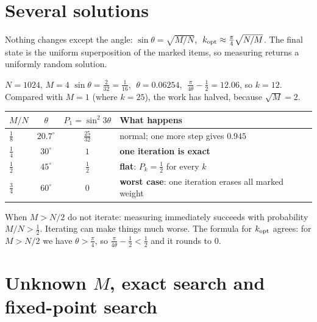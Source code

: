 \documentclass[11pt,a4paper,openany]{book}
\newcounter{wex}[section]
\newcommand{\kopt}{k_{\rm opt}}
\begin{document}
\section{Several solutions}
Nothing changes except the angle: $\sin\theta = \sqrt{M/N}$, $\;\kopt \approx \frac\pi4\sqrt{N/M}$. The final state is the uniform superposition of the marked items, so measuring returns a uniformly random solution.
\begin{wexample}{$N = 1024$, $M = 4$}
$\sin\theta = \frac{2}{32} = \frac{1}{16}$, $\;\theta = 0.06254$, $\;\frac{\pi}{4\theta} - \frac12 = 12.06$, so $k = 12$. Compared with $M = 1$ (where $k = 25$), the work has halved, because $\sqrt M = 2$.
\end{wexample}
\begin{center}
\renewcommand{\arraystretch}{1.2}
\begin{tabular}{@{}lccl@{}}
\toprule
$M/N$ & $\theta$ & $P_1 = \sin^2 3\theta$ & What happens\\ \midrule
$\frac18$ & $20.7^\circ$ & $\frac{25}{32}$ & normal; one more step gives $0.945$\\
$\frac14$ & $30^\circ$ & $1$ & \textbf{one iteration is exact}\\
$\frac12$ & $45^\circ$ & $\frac12$ & \textbf{flat}: $P_k = \frac12$ for every $k$\\
$\frac34$ & $60^\circ$ & $0$ & \textbf{worst case}: one iteration erases all marked weight\\
\bottomrule
\end{tabular}
\end{center}
\begin{trap}
When $M > N/2$ do not iterate: measuring immediately succeeds with probability $M/N > \frac12$. Iterating can make things much worse. The formula for $\kopt$ agrees: for $M > N/2$ we have $\theta > \frac\pi4$, so $\frac{\pi}{4\theta} - \frac12 < \frac12$ and it rounds to $0$.
\end{trap}

\section{Unknown $M$, exact search and fixed-point search}
\end{document}
